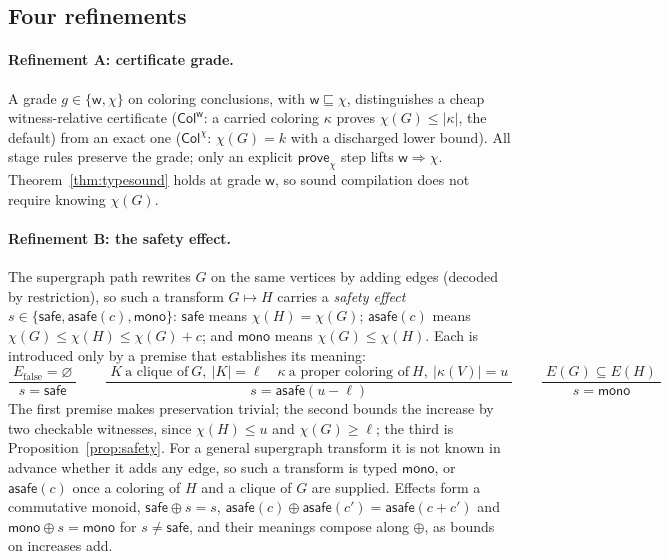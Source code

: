 \documentclass[a4paper,fleqn]{cas-sc}
\newcommand{\Efalse}{E_{\mathrm{false}}}
\newcommand{\tCol}{\mathsf{Col}}
\newcommand{\safe}{\textsf{safe}}
\newcommand{\asafe}[1]{\textsf{asafe}(#1)}
\newcommand{\monoeff}{\textsf{mono}}
\newcommand{\irule}[2]{\ensuremath{\dfrac{\;#1\;}{\;#2\;}}}
\begin{document}
\subsection{Four refinements}
\label{sec:refine}

\paragraph{Refinement A: certificate grade.} A grade $g\in\{\mathsf{w},\chi\}$ on
coloring conclusions, with $\mathsf{w}\sqsubseteq\chi$, distinguishes a cheap
witness-relative certificate ($\tCol^{\mathsf{w}}$: a carried coloring $\kappa$
proves $\chi(G)\le|\kappa|$, the default) from an exact one ($\tCol^{\chi}$:
$\chi(G)=k$ with a discharged lower bound). All stage rules preserve the grade; only
an explicit $\mathsf{prove}_\chi$ step lifts $\mathsf{w}\!\Rightarrow\!\chi$.
Theorem~\ref{thm:typesound} holds at grade $\mathsf{w}$, so sound compilation does
not require knowing $\chi(G)$.

\paragraph{Refinement B: the safety effect.}
\label{sec:safetyeff}
The supergraph path rewrites $G$ on the same vertices by adding edges (decoded by
restriction), so such a transform $G\mapsto H$ carries a \emph{safety effect}
$s\in\{\safe,\asafe{c},\monoeff\}$: $\safe$ means $\chi(H)=\chi(G)$;
$\asafe{c}$ means $\chi(G)\le\chi(H)\le\chi(G)+c$; and $\monoeff$ means
$\chi(G)\le\chi(H)$. Each is introduced only by a premise that establishes its meaning:
\[
  \irule{\Efalse=\varnothing}{s=\safe}
  \qquad
  \irule{K\ \text{a clique of}\ G,\ |K|=\ell \quad
         \kappa\ \text{a proper coloring of}\ H,\ |\kappa(V)|=u}
        {s=\asafe{u-\ell}}
  \qquad
  \irule{E(G)\subseteq E(H)}{s=\monoeff}
\]
The first premise makes preservation trivial; the second bounds the increase by two
checkable witnesses, since $\chi(H)\le u$ and $\chi(G)\ge\ell$; the third is
Proposition~\ref{prop:safety}. For a general supergraph transform it is not known in
advance whether it adds any edge, so such a transform is typed $\monoeff$, or
$\asafe{c}$ once a coloring of $H$ and a clique of $G$ are supplied. Effects form a commutative monoid,
$\safe\oplus s=s$, $\asafe{c}\oplus\asafe{c'}=\asafe{c{+}c'}$ and $\monoeff\oplus
s=\monoeff$ for $s\ne\safe$, and their meanings compose along $\oplus$, as bounds
on increases add.
\end{document}
